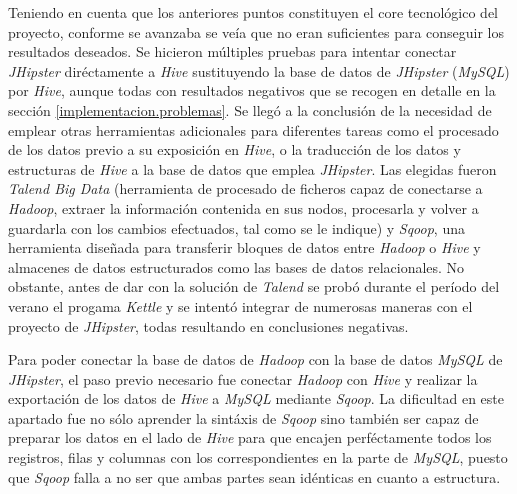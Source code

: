 	\par
	Teniendo en cuenta que los anteriores puntos constituyen el core tecnológico del proyecto, conforme se avanzaba se veía que no eran suficientes para conseguir los resultados deseados. Se hicieron múltiples pruebas para intentar conectar \textit{JHipster} diréctamente a \textit{Hive} sustituyendo la base de datos de \textit{JHipster} (\textit{MySQL}) por \textit{Hive}, aunque todas con resultados negativos que se recogen en detalle en la sección \ref{implementacion.problemas}. Se llegó a la conclusión de la necesidad de emplear otras herramientas adicionales para diferentes tareas como el procesado de los datos previo a su exposición en \textit{Hive}, o la traducción de los datos y estructuras de \textit{Hive} a la base de datos que emplea \textit{JHipster}. Las elegidas fueron \textit{Talend Big Data} (herramienta de procesado de ficheros capaz de conectarse a \textit{Hadoop},  extraer la información contenida en sus nodos, procesarla y volver a guardarla con los cambios efectuados, tal como se le indique) y \textit{Sqoop}, una herramienta diseñada para transferir bloques de datos entre \textit{Hadoop} o \textit{Hive} y almacenes de datos estructurados como las bases de datos relacionales. No obstante, antes de dar con la solución de \textit{Talend} se probó durante el período del verano el progama \textit{Kettle} \cite{kettle} y se intentó integrar de numerosas maneras con el proyecto de \textit{JHipster}, todas resultando en conclusiones negativas.
	\par	
	Para poder conectar la base de datos de \textit{Hadoop} con la base de datos \textit{MySQL} de \textit{JHipster}, el paso previo necesario fue conectar \textit{Hadoop} con \textit{Hive} y realizar la exportación de los datos de \textit{Hive} a \textit{MySQL} mediante \textit{Sqoop}. La dificultad en este apartado fue no sólo aprender la sintáxis de \textit{Sqoop} sino también ser capaz de preparar los datos en el lado de \textit{Hive} para que encajen perféctamente todos los registros, filas y columnas con los correspondientes en la parte de \textit{MySQL}, puesto que \textit{Sqoop} falla a no ser que ambas partes sean idénticas en cuanto a estructura. \par

